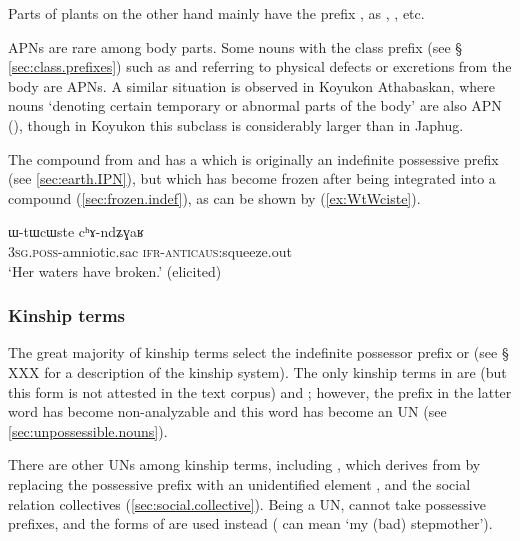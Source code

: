 Parts of plants on the other hand mainly have the prefix , as , ,  etc.

APNs are rare among body parts. Some nouns with the  class prefix (see § \ref{sec:class.prefixes}) such as  and  referring to physical defects or excretions from the body are APNs. A similar situation is observed in Koyukon Athabaskan, where nouns `denoting certain temporary or abnormal parts of the body' are also APN (\citealt[660]{thompson96koyukon}), though in Koyukon this subclass is considerably larger than in Japhug.

The compound  from  and  has a  which is originally an indefinite possessive prefix (see \ref{sec:earth.IPN}), but which has become frozen after being integrated into a compound (\ref{sec:frozen.indef}), as can be shown by (\ref{ex:WtWciste}). 

\begin{exe}
\ex \label{ex:WtWciste}
\gll ɯ-tɯcɯste cʰɤ-ndʑɣaʁ \\
\textsc{3sg.poss}-amniotic.sac \textsc{ifr}-\textsc{anticaus}:squeeze.out \\
\glt `Her waters have broken.' (elicited)
\end{exe}


\subsubsection{Kinship terms} \label{sec:kinship}
The great majority of kinship terms select the indefinite possessor prefix  or  (see § XXX for a description of the kinship system). The only kinship terms in  are  (but this form is not attested in the text corpus) and ; however, the  prefix in the latter word has become non-analyzable and this word has become an UN (see \ref{sec:unpossessible.nouns}). 

There are other UNs among kinship terms, including , which derives from  by replacing the possessive prefix with an unidentified element , and the social relation collectives (\ref{sec:social.collective}). Being a UN,  cannot take possessive prefixes, and the forms of  are used instead ( can mean `my (bad) stepmother').

